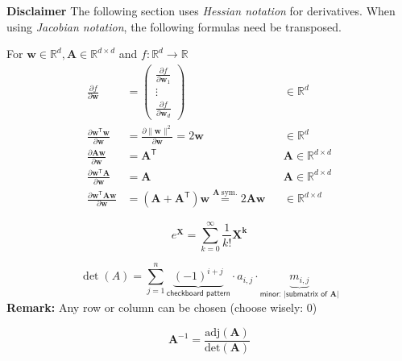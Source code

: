 \newpar{}
\textbf{Disclaimer} The following section uses \textit{Hessian notation} for derivatives. When using \textit{Jacobian notation}, the following formulas need be transposed.

\newpar{}
For $\mathbf{w}\in \mathbb{R}^d, \mathbf{A}\in \mathbb{R}^{d\times d}$ and $ f: \mathbb{R}^d\to \mathbb{R}$
\noindent\begin{align*}
    \frac{\partial f}{\partial \mathbf{w}}                                  & =
    \begin{pmatrix}\frac{\partial f}{\partial \mathbf{w}_1} \\
        \vdots                                   \\
        \frac{\partial f}{\partial \mathbf{w}_d}
    \end{pmatrix} &                                                                                                                 & \in \mathbb{R}^d                                                                                                  \\[2em]
    \frac{\partial \mathbf{w}^{\mathsf{T}}\mathbf{w}}{\partial \mathbf{w}}  & =\frac{\partial\|\mathbf{w}\|^2}{\partial \mathbf{w}}=2\mathbf{w}                                               &                  & \in \mathbb{R}^d                     \\
    \frac{\partial \mathbf{A}\mathbf{w}}{\partial \mathbf{w}}               & ={\mathbf{A}}^{\mathsf{T}}                                                                                      &                  & \mathbf{A}\in \mathbb{R}^{d\times d} \\
    \frac{\partial \mathbf{w}^{\mathsf{T}}\mathbf{A}}{\partial \mathbf{w}}  & = \mathbf{A}                                                                                                    &                  & \mathbf{A}\in \mathbb{R}^{d\times d} \\
    \frac{\partial \mathbf{w}^{\mathsf{T}}\mathbf{Aw}}{\partial \mathbf{w}} & = \left(\mathbf{A}+\mathbf{A}^{\mathsf{T}}\right)\mathbf{w} \overset{\mathbf{A}\ \mathrm{sym.}}{=} 2\mathbf{Aw} &                  & \in \mathbb{R}^{d\times d}
\end{align*}

\newpar{}
\begin{equation*}
    e^{\mathbf{X}} = \sum_{k=0}^{\infty}\frac{1}{k!}\mathbf{X^k}
\end{equation*}

\newpar{}
\noindent\begin{equation*}
    \det(A)=\sum_{j=1}^n \underbrace{{(-1)}^{i+j}}_{\textsf{checkboard pattern}}\cdot a_{i,j}\cdot\underbrace{m_{i,j}}_{\textsf{minor: |submatrix of }\mathbf{A}|}
\end{equation*}
\textbf{Remark:} Any row or column can be chosen (choose wisely: 0)

\newpar{}
\begin{equation*}
    \mathbf{A}^{-1}  = \frac{\text{adj}(\mathbf{A})}{\text{det}(\mathbf{A})}
\end{equation*}